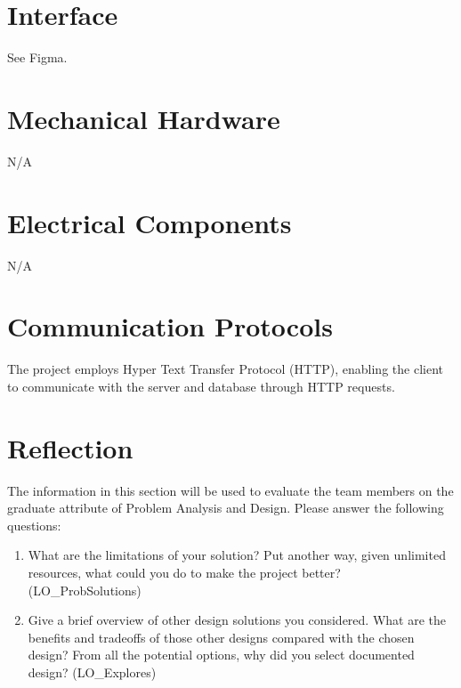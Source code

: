 \documentclass[12pt, titlepage]{article}
\begin{document}
	\newpage{}
	
	\appendix
	
	\section{Interface}
	
	See Figma.
	
	\section{Mechanical Hardware}
	N/A
	
	\section{Electrical Components}
	N/A
	
	\section{Communication Protocols}
	The project employs Hyper Text Transfer Protocol (HTTP), enabling the client to communicate with the server and database through HTTP requests.
	
	\section{Reflection}
	
	The information in this section will be used to evaluate the team members on the
	graduate attribute of Problem Analysis and Design.  Please answer the following questions:
	
	\begin{enumerate}
		\item What are the limitations of your solution?  Put another way, given
		unlimited resources, what could you do to make the project better? (LO\_ProbSolutions)
		\item Give a brief overview of other design solutions you considered.  What
		are the benefits and tradeoffs of those other designs compared with the chosen
		design?  From all the potential options, why did you select documented design?
		(LO\_Explores)
	\end{enumerate}
	
\end{document}
